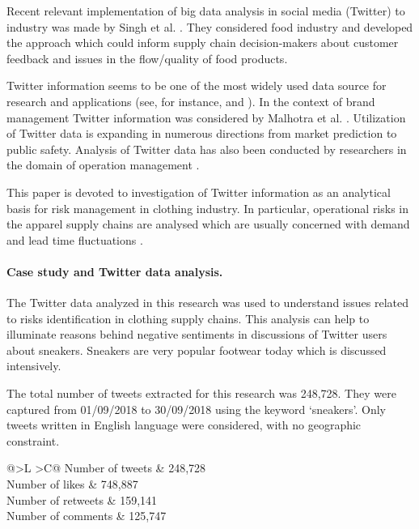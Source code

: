 Recent relevant implementation of big data analysis in social media (Twitter) to industry was made by Singh et al. \cite{SinghShuklaMishra}. They considered food industry and developed the approach which could inform supply chain decision-makers about customer feedback and issues in the flow/quality of food products.

Twitter information seems to be one of the most widely used data source for research and applications (see, for instance, \cite{ChenElmesChang} and \cite{BodrunovaLitvinenkoBlekanov}). In the context of brand management Twitter information was considered by Malhotra et al. \cite{MalhotraMalhotraSee}. Utilization of Twitter data is expanding in numerous directions from market prediction to public safety. Analysis of Twitter data has also been conducted by researchers in the domain of operation management \cite{TanZhanJi,FanNiu}.

This paper is devoted to investigation of Twitter information as an analytical basis for risk management in clothing industry. In particular, operational risks in the apparel supply chains are analysed which are usually concerned with demand and lead time fluctuations \cite{Ivanov,IvanovDolguiSokolov}.

\paragraph{Case study and Twitter data analysis.} The Twitter data analyzed in this research was used to understand issues related to risks identification in clothing supply chains. This analysis can help to illuminate reasons behind negative sentiments in discussions of Twitter users about sneakers. Sneakers are very popular footwear today which is discussed intensively. 

The total number of tweets extracted for this research was 248,728. They were captured from 01/09/2018 to 30/09/2018 using the keyword ‘sneakers’. Only tweets written in English language were considered, with no geographic constraint.

\begin{table} [htbp]%
	\centering
	\caption{Size of the discussion.}%
	\label{tab:discussionSize}%
	\renewcommand{\arraystretch}{1.6}%
		\begin{tabulary}{\textwidth}{@{}>{\zz}L >{\zz}C@{}}%
			\toprule     %
			Number of tweets & 248,728 \\ 
			Number of likes & 748,887  \\
			Number of retweets & 159,141 \\ 
			Number of comments & 125,747 \\ 
			\bottomrule %
		\end{tabulary}%
\end{table}

